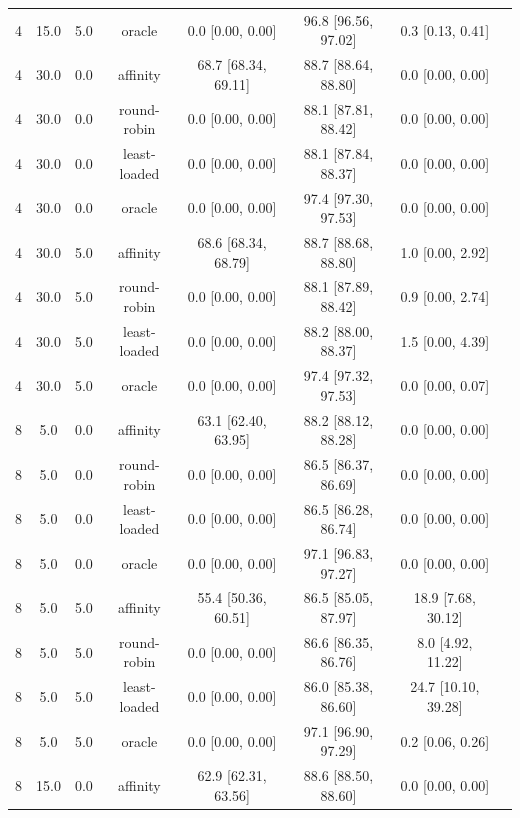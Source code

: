 \begin{table}[t]
\begin{tabular}{lccccccc}
4 & 15.0 & 5.0 & oracle & 0.0 \tiny [0.00, 0.00] & 96.8 \tiny [96.56, 97.02] & 0.3 \tiny [0.13, 0.41] \\
4 & 30.0 & 0.0 & affinity & 68.7 \tiny [68.34, 69.11] & 88.7 \tiny [88.64, 88.80] & 0.0 \tiny [0.00, 0.00] \\
4 & 30.0 & 0.0 & round-robin & 0.0 \tiny [0.00, 0.00] & 88.1 \tiny [87.81, 88.42] & 0.0 \tiny [0.00, 0.00] \\
4 & 30.0 & 0.0 & least-loaded & 0.0 \tiny [0.00, 0.00] & 88.1 \tiny [87.84, 88.37] & 0.0 \tiny [0.00, 0.00] \\
4 & 30.0 & 0.0 & oracle & 0.0 \tiny [0.00, 0.00] & 97.4 \tiny [97.30, 97.53] & 0.0 \tiny [0.00, 0.00] \\
4 & 30.0 & 5.0 & affinity & 68.6 \tiny [68.34, 68.79] & 88.7 \tiny [88.68, 88.80] & 1.0 \tiny [0.00, 2.92] \\
4 & 30.0 & 5.0 & round-robin & 0.0 \tiny [0.00, 0.00] & 88.1 \tiny [87.89, 88.42] & 0.9 \tiny [0.00, 2.74] \\
4 & 30.0 & 5.0 & least-loaded & 0.0 \tiny [0.00, 0.00] & 88.2 \tiny [88.00, 88.37] & 1.5 \tiny [0.00, 4.39] \\
4 & 30.0 & 5.0 & oracle & 0.0 \tiny [0.00, 0.00] & 97.4 \tiny [97.32, 97.53] & 0.0 \tiny [0.00, 0.07] \\
8 & 5.0 & 0.0 & affinity & 63.1 \tiny [62.40, 63.95] & 88.2 \tiny [88.12, 88.28] & 0.0 \tiny [0.00, 0.00] \\
8 & 5.0 & 0.0 & round-robin & 0.0 \tiny [0.00, 0.00] & 86.5 \tiny [86.37, 86.69] & 0.0 \tiny [0.00, 0.00] \\
8 & 5.0 & 0.0 & least-loaded & 0.0 \tiny [0.00, 0.00] & 86.5 \tiny [86.28, 86.74] & 0.0 \tiny [0.00, 0.00] \\
8 & 5.0 & 0.0 & oracle & 0.0 \tiny [0.00, 0.00] & 97.1 \tiny [96.83, 97.27] & 0.0 \tiny [0.00, 0.00] \\
8 & 5.0 & 5.0 & affinity & 55.4 \tiny [50.36, 60.51] & 86.5 \tiny [85.05, 87.97] & 18.9 \tiny [7.68, 30.12] \\
8 & 5.0 & 5.0 & round-robin & 0.0 \tiny [0.00, 0.00] & 86.6 \tiny [86.35, 86.76] & 8.0 \tiny [4.92, 11.22] \\
8 & 5.0 & 5.0 & least-loaded & 0.0 \tiny [0.00, 0.00] & 86.0 \tiny [85.38, 86.60] & 24.7 \tiny [10.10, 39.28] \\
8 & 5.0 & 5.0 & oracle & 0.0 \tiny [0.00, 0.00] & 97.1 \tiny [96.90, 97.29] & 0.2 \tiny [0.06, 0.26] \\
8 & 15.0 & 0.0 & affinity & 62.9 \tiny [62.31, 63.56] & 88.6 \tiny [88.50, 88.60] & 0.0 \tiny [0.00, 0.00] \\

\end{tabular}
\end{table}
